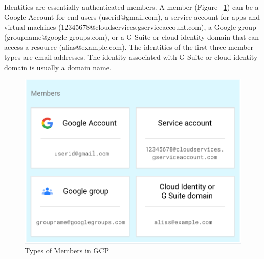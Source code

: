 \documentclass[sigconf]{acmart}
\begin{document}
Identities are essentially authenticated members. A member (Figure ~\ref{fig:mem}) can be a Google Account for end users (userid@gmail.com), a service account for apps and virtual machines (12345678@cloudservices.gserviceaccount.com), a Google group (groupname@google groups.com), or a G Suite or cloud identity domain that can access a resource (alias@example.com). The identities of the first three member types are email addresses. The identity associated with G Suite or cloud identity domain is usually a domain name.
\begin{figure}[h]
  \centering
  \includegraphics[width=\linewidth]{pic/mem}
  \caption {Types of Members in GCP}
  \label{fig:mem}
\end{figure}
\end{document}
